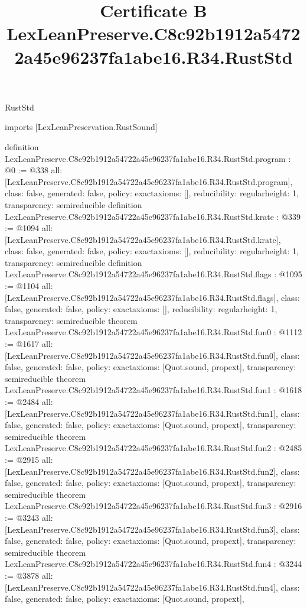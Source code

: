 \begin{lexlean}{RustStd}
\title{Certificate B LexLeanPreserve.C8c92b1912a54722a45e96237fa1abe16.R34.RustStd}
\begin{coremodule}
imports [LexLeanPreservation.RustSound]

definition LexLeanPreserve.C8c92b1912a54722a45e96237fa1abe16.R34.RustStd.program : @0 := @338 {
  all: [LexLeanPreserve.C8c92b1912a54722a45e96237fa1abe16.R34.RustStd.program],
  class: false,
  generated: false,
  policy: exact{axioms: []},
  reducibility: regular{height: 1},
  transparency: semireducible
}
definition LexLeanPreserve.C8c92b1912a54722a45e96237fa1abe16.R34.RustStd.krate : @339 := @1094 {
  all: [LexLeanPreserve.C8c92b1912a54722a45e96237fa1abe16.R34.RustStd.krate],
  class: false,
  generated: false,
  policy: exact{axioms: []},
  reducibility: regular{height: 1},
  transparency: semireducible
}
definition LexLeanPreserve.C8c92b1912a54722a45e96237fa1abe16.R34.RustStd.flags : @1095 := @1104 {
  all: [LexLeanPreserve.C8c92b1912a54722a45e96237fa1abe16.R34.RustStd.flags],
  class: false,
  generated: false,
  policy: exact{axioms: []},
  reducibility: regular{height: 1},
  transparency: semireducible
}
theorem LexLeanPreserve.C8c92b1912a54722a45e96237fa1abe16.R34.RustStd.fun0 : @1112 := @1617 {
  all: [LexLeanPreserve.C8c92b1912a54722a45e96237fa1abe16.R34.RustStd.fun0],
  class: false,
  generated: false,
  policy: exact{axioms: [Quot.sound, propext]},
  transparency: semireducible
}
theorem LexLeanPreserve.C8c92b1912a54722a45e96237fa1abe16.R34.RustStd.fun1 : @1618 := @2484 {
  all: [LexLeanPreserve.C8c92b1912a54722a45e96237fa1abe16.R34.RustStd.fun1],
  class: false,
  generated: false,
  policy: exact{axioms: [Quot.sound, propext]},
  transparency: semireducible
}
theorem LexLeanPreserve.C8c92b1912a54722a45e96237fa1abe16.R34.RustStd.fun2 : @2485 := @2915 {
  all: [LexLeanPreserve.C8c92b1912a54722a45e96237fa1abe16.R34.RustStd.fun2],
  class: false,
  generated: false,
  policy: exact{axioms: [Quot.sound, propext]},
  transparency: semireducible
}
theorem LexLeanPreserve.C8c92b1912a54722a45e96237fa1abe16.R34.RustStd.fun3 : @2916 := @3243 {
  all: [LexLeanPreserve.C8c92b1912a54722a45e96237fa1abe16.R34.RustStd.fun3],
  class: false,
  generated: false,
  policy: exact{axioms: [Quot.sound, propext]},
  transparency: semireducible
}
theorem LexLeanPreserve.C8c92b1912a54722a45e96237fa1abe16.R34.RustStd.fun4 : @3244 := @3878 {
  all: [LexLeanPreserve.C8c92b1912a54722a45e96237fa1abe16.R34.RustStd.fun4],
  class: false,
  generated: false,
  policy: exact{axioms: [Quot.sound, propext]},
}
\end{coremodule}
\end{lexlean}
